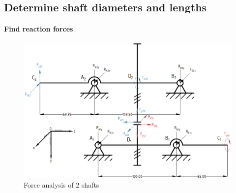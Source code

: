 \subsection{Determine shaft diameters and lengths}

\paragraph{Find reaction forces}

\begin{figure}[ht]
	\centering
	\includegraphics[width=160mm]{shaft.png}
	\caption{Force analysis of 2 shafts}
	\label{force on shaft}
\end{figure}

